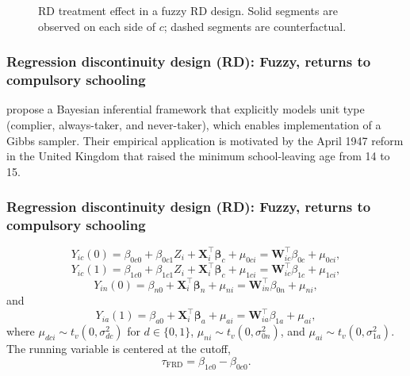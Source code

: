 \documentclass[12pt, compress]{beamer}
\begin{document}
\begin{frame}
\begin{figure}[ht]
	\caption{RD treatment effect in a fuzzy RD design. Solid segments are observed on each side of $c$; dashed segments are counterfactual.}
	\label{fig:FRD-muplus-muminus}
\end{figure}
\end{frame}

\begin{frame}
	\frametitle{Regression discontinuity design (RD): Fuzzy, returns to compulsory schooling}
\cite{chib2016bayesian} propose a Bayesian inferential framework that explicitly models unit type (complier, always-taker, and never-taker), which enables implementation of a Gibbs sampler. Their empirical application is motivated by the April 1947 reform in the United Kingdom that raised the minimum school-leaving age from 14 to 15.
\end{frame}

\begin{frame}
	\frametitle{Regression discontinuity design (RD): Fuzzy, returns to compulsory schooling}
\[
Y_{ic}(0)=\beta_{0c0}+\beta_{0c1}Z_i+\mathbf{X}_i^{\top}\boldsymbol{\beta}_c+\mu_{0ci}=\mathbf{W}_{ic}^{\top}\beta_{0c}+\mu_{0ci},
\]
\[
Y_{ic}(1)=\beta_{1c0}+\beta_{1c1}Z_i+\mathbf{X}_i^{\top}\boldsymbol{\beta}_c+\mu_{1ci}=\mathbf{W}_{ic}^{\top}\beta_{1c}+\mu_{1ci},
\]
\[
Y_{in}(0)=\beta_{n0}+\mathbf{X}_i^{\top}\boldsymbol{\beta}_n+\mu_{ni}=\mathbf{W}_{in}^{\top}\beta_{0n}+\mu_{ni},
\]
and
\[
Y_{ia}(1)=\beta_{a0}+\mathbf{X}_i^{\top}\boldsymbol{\beta}_a+\mu_{ai}=\mathbf{W}_{ia}^{\top}\beta_{1a}+\mu_{ai},
\]
where $\mu_{dci}\sim t_v(0,\sigma^2_{dc})$ for $d\in\{0,1\}$, $\mu_{ni}\sim t_v(0,\sigma^2_{0n})$, and $\mu_{ai}\sim t_v(0,\sigma^2_{1a})$. The running variable is centered at the cutoff, 
\[
\tau_{\text{FRD}}=\beta_{1c0}-\beta_{0c0}.
\]

\end{frame}
\end{document}

